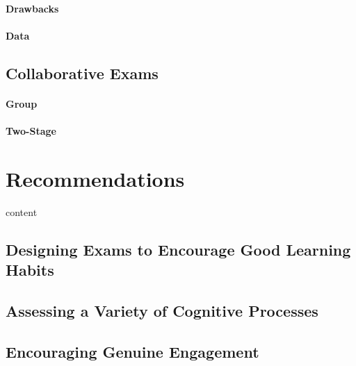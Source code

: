 \documentclass[12pt]{article}
\begin{document}
\paragraph{Drawbacks}
\paragraph{Data}

\subsection{Collaborative Exams}\label{subsec:collab}
\paragraph{Group}
\paragraph{Two-Stage}


\section{Recommendations}\label{sec:recommendations}
content
\subsection{Designing Exams to Encourage Good Learning Habits}
\subsection{Assessing a Variety of Cognitive Processes}
\subsection{Encouraging Genuine Engagement}
\nocite{*}


\end{document}
